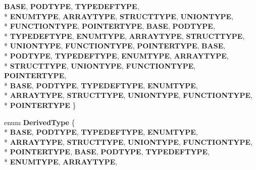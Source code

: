 \begin{DoxyCompactItemize}
{\bfseries B\-A\-S\-E}, 
{\bfseries P\-O\-D\-T\-Y\-P\-E}, 
{\bfseries T\-Y\-P\-E\-D\-E\-F\-T\-Y\-P\-E}, 
\\*
{\bfseries E\-N\-U\-M\-T\-Y\-P\-E}, 
{\bfseries A\-R\-R\-A\-Y\-T\-Y\-P\-E}, 
{\bfseries S\-T\-R\-U\-C\-T\-T\-Y\-P\-E}, 
{\bfseries U\-N\-I\-O\-N\-T\-Y\-P\-E}, 
\\*
{\bfseries F\-U\-N\-C\-T\-I\-O\-N\-T\-Y\-P\-E}, 
{\bfseries P\-O\-I\-N\-T\-E\-R\-T\-Y\-P\-E}, 
{\bfseries B\-A\-S\-E}, 
{\bfseries P\-O\-D\-T\-Y\-P\-E}, 
\\*
{\bfseries T\-Y\-P\-E\-D\-E\-F\-T\-Y\-P\-E}, 
{\bfseries E\-N\-U\-M\-T\-Y\-P\-E}, 
{\bfseries A\-R\-R\-A\-Y\-T\-Y\-P\-E}, 
{\bfseries S\-T\-R\-U\-C\-T\-T\-Y\-P\-E}, 
\\*
{\bfseries U\-N\-I\-O\-N\-T\-Y\-P\-E}, 
{\bfseries F\-U\-N\-C\-T\-I\-O\-N\-T\-Y\-P\-E}, 
{\bfseries P\-O\-I\-N\-T\-E\-R\-T\-Y\-P\-E}, 
{\bfseries B\-A\-S\-E}, 
\\*
{\bfseries P\-O\-D\-T\-Y\-P\-E}, 
{\bfseries T\-Y\-P\-E\-D\-E\-F\-T\-Y\-P\-E}, 
{\bfseries E\-N\-U\-M\-T\-Y\-P\-E}, 
{\bfseries A\-R\-R\-A\-Y\-T\-Y\-P\-E}, 
\\*
{\bfseries S\-T\-R\-U\-C\-T\-T\-Y\-P\-E}, 
{\bfseries U\-N\-I\-O\-N\-T\-Y\-P\-E}, 
{\bfseries F\-U\-N\-C\-T\-I\-O\-N\-T\-Y\-P\-E}, 
{\bfseries P\-O\-I\-N\-T\-E\-R\-T\-Y\-P\-E}, 
\\*
{\bfseries B\-A\-S\-E}, 
{\bfseries P\-O\-D\-T\-Y\-P\-E}, 
{\bfseries T\-Y\-P\-E\-D\-E\-F\-T\-Y\-P\-E}, 
{\bfseries E\-N\-U\-M\-T\-Y\-P\-E}, 
\\*
{\bfseries A\-R\-R\-A\-Y\-T\-Y\-P\-E}, 
{\bfseries S\-T\-R\-U\-C\-T\-T\-Y\-P\-E}, 
{\bfseries U\-N\-I\-O\-N\-T\-Y\-P\-E}, 
{\bfseries F\-U\-N\-C\-T\-I\-O\-N\-T\-Y\-P\-E}, 
\\*
{\bfseries P\-O\-I\-N\-T\-E\-R\-T\-Y\-P\-E}
 \}
\item 
enum {\bfseries Derived\-Type} \{ \\*
{\bfseries B\-A\-S\-E}, 
{\bfseries P\-O\-D\-T\-Y\-P\-E}, 
{\bfseries T\-Y\-P\-E\-D\-E\-F\-T\-Y\-P\-E}, 
{\bfseries E\-N\-U\-M\-T\-Y\-P\-E}, 
\\*
{\bfseries A\-R\-R\-A\-Y\-T\-Y\-P\-E}, 
{\bfseries S\-T\-R\-U\-C\-T\-T\-Y\-P\-E}, 
{\bfseries U\-N\-I\-O\-N\-T\-Y\-P\-E}, 
{\bfseries F\-U\-N\-C\-T\-I\-O\-N\-T\-Y\-P\-E}, 
\\*
{\bfseries P\-O\-I\-N\-T\-E\-R\-T\-Y\-P\-E}, 
{\bfseries B\-A\-S\-E}, 
{\bfseries P\-O\-D\-T\-Y\-P\-E}, 
{\bfseries T\-Y\-P\-E\-D\-E\-F\-T\-Y\-P\-E}, 
\\*
{\bfseries E\-N\-U\-M\-T\-Y\-P\-E}, 
{\bfseries A\-R\-R\-A\-Y\-T\-Y\-P\-E}, 

\end{DoxyCompactItemize}
